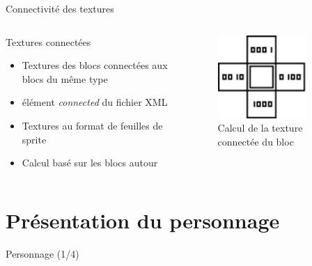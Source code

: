 \documentclass{beamer}
\begin{document}
{\begin{frame}{Connectivité des textures}
    \begin{columns}
            \begin{block}{Textures connectées}
                \begin{itemize}
                    \item[\bullet] Textures des blocs connectées aux blocs du même type
                    \item[\bullet] élément \emph{connected} du fichier XML
                    \item[\bullet] Textures au format de feuilles de sprite
                    \item[\bullet] Calcul basé sur les blocs autour
                \end{itemize}
            \end{block}
            \begin{figure}
                \centering
                \includegraphics[width=0.8\textwidth]{images/connected_textures_offset_computing}
                \caption{Calcul de la texture connectée du bloc}
            \end{figure}
    \end{columns}
\end{frame}

\section{Présentation du personnage}
\begin{frame}{Personnage (1/4)}


\end{frame}}
\end{document}
